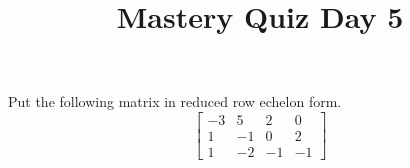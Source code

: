 \documentclass{sbgquiz}
\title{Mastery Quiz Day 5 }
\begin{document}
\begin{problem}[E2]
Put the following matrix in reduced row echelon form.
$$\begin{bmatrix}
-3 & 5 & 2 & 0 \\
 1 & -1 & 0 & 2 \\
 1 & -2 & -1 & -1
\end{bmatrix}$$
\end{problem}
\end{document}
